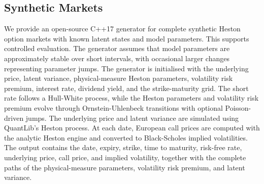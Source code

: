 \documentclass[sigconf,anonymous,review]{acmart}
\begin{document}
\subsection{Synthetic Markets}
We provide an open-source C++17 generator for complete synthetic Heston option markets with known latent states and model parameters. This
supports controlled evaluation. The generator assumes that model parameters are approximately stable over short intervals, with occasional larger changes representing parameter jumps.
The generator is initialised with the underlying price, latent variance,
physical-measure Heston parameters, volatility risk premium, interest rate, dividend yield, and the strike-maturity grid. The short rate follows a Hull-White process, while the Heston parameters and volatility risk premium evolve through Ornstein-Uhlenbeck transitions with optional Poisson-driven jumps. The underlying price and latent variance are simulated using QuantLib's Heston process. At each date, European call prices are computed with the analytic Heston engine and converted
to Black-Scholes implied volatilities.  The output contains the date, expiry, strike, time to maturity, risk-free rate, underlying price, call price, and implied volatility, together with the complete paths of the physical-measure parameters, volatility risk premium, and latent variance.

\end{document}
